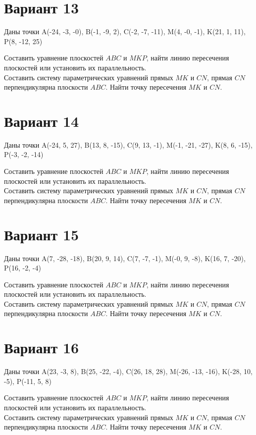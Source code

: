 \documentclass[11pt]{article}
\begin{document}
\section*{Вариант 13}
Даны точки A(-24, -3, -0), B(-1, -9, 2), C(-2, -7, -11), M(4, -0, -1), K(21, 1, 11), P(8, -12, 25)

Составить уравнение плоскостей $ABC$ и $MKP$, найти линию пересечения плоскостей или установить их параллельность.\\
Составить систему параметрических уравнений прямых $MK$ и $CN$, прямая $CN$ перпендикулярна плоскости $ABC$. Найти точку пересечения $MK$ и $CN$.

\section*{Вариант 14}
Даны точки A(-24, 5, 27), B(13, 8, -15), C(9, 13, -1), M(-1, -21, -27), K(8, 6, -15), P(-3, -2, -14)

Составить уравнение плоскостей $ABC$ и $MKP$, найти линию пересечения плоскостей или установить их параллельность.\\
Составить систему параметрических уравнений прямых $MK$ и $CN$, прямая $CN$ перпендикулярна плоскости $ABC$. Найти точку пересечения $MK$ и $CN$.

\section*{Вариант 15}
Даны точки A(7, -28, -18), B(20, 9, 14), C(7, -7, -1), M(-0, 9, -8), K(16, 7, -20), P(16, -2, -4)

Составить уравнение плоскостей $ABC$ и $MKP$, найти линию пересечения плоскостей или установить их параллельность.\\
Составить систему параметрических уравнений прямых $MK$ и $CN$, прямая $CN$ перпендикулярна плоскости $ABC$. Найти точку пересечения $MK$ и $CN$.

\section*{Вариант 16}
Даны точки A(23, -3, 8), B(25, -22, -4), C(26, 18, 28), M(-26, -13, -16), K(-28, 10, -5), P(-11, 5, 8)

Составить уравнение плоскостей $ABC$ и $MKP$, найти линию пересечения плоскостей или установить их параллельность.\\
Составить систему параметрических уравнений прямых $MK$ и $CN$, прямая $CN$ перпендикулярна плоскости $ABC$. Найти точку пересечения $MK$ и $CN$.
\end{document}
